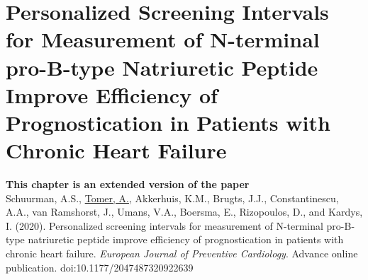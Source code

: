 \chapter[Personalized Screening Intervals for Measurement of N-terminal pro-B-type Natriuretic Peptide Improve Efficiency of Prognostication in Patients with Chronic Heart Failure][Personalized Screening Intervals for NT-proBNP]{Personalized Screening Intervals for Measurement of N-terminal pro-B-type Natriuretic Peptide Improve Efficiency of Prognostication in Patients with Chronic Heart Failure}
\label{c6}

\vspace*{\fill}
\textbf{This chapter is an extended version of the paper}\\
Schuurman, A.S., \underline{Tomer, A.}, Akkerhuis, K.M., Brugts, J.J., Constantinescu, A.A., van Ramshorst, J., Umans, V.A., Boersma, E., Rizopoulos, D., and Kardys, I. (2020). Personalized screening intervals for measurement of N-terminal pro-B-type natriuretic peptide improve efficiency of prognostication in patients with chronic heart failure. \emph{European Journal of Preventive Cardiology}. Advance online publication. doi:10.1177/2047487320922639\\

\clearpage

\clearpage








\clearpage

